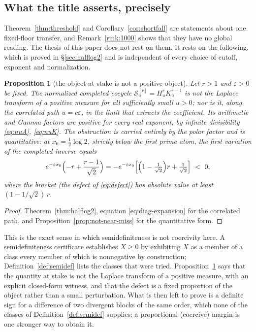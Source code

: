 \documentclass[11pt]{amsart}
\newtheorem{proposition}[theorem]{Proposition}
\theoremstyle{definition}
\theoremstyle{remark}
\theoremstyle{definition}
\newcommand{\eps}{\varepsilon}
\begin{document}
\subsection{What the title asserts, precisely}\label{sec:thesis}

Theorem~\ref{thm:threshold} and Corollary~\ref{cor:shortfall} are statements about one
fixed-floor transfer, and Remark~\ref{rmk:1000} shows that they have no global reading. The thesis of this paper does not rest on them. It rests on the following,
which is proved in \S\ref{sec:halflog2} and is independent of every choice of cutoff, exponent
and normalization.

\begin{proposition}[the object at stake is not a positive object]\label{prop:thesis}
Let $r>1$ and $\eps>0$ be fixed. The normalized completed cocycle
$\mathcal S_u^{[r]}=H_u^{r}K_u^{r-1}$ is not the Laplace transform of a positive measure for all
sufficiently small $u>0$; nor is it, along the correlated path $u=c\eps$, in the limit that
extracts the coefficient. Its arithmetic and Gamma factors \emph{are} positive for every real
exponent, by infinite divisibility \eqref{eq:nuA}, \eqref{eq:nuK}. The obstruction is carried
entirely by the polar factor and is quantitative: at $x_0=\tfrac12\log2$, strictly below the
first prime atom, the first variation of the completed inverse equals
\[
   e^{-\eps x_0}\Bigl(-r+\frac{r-1}{\sqrt2}\Bigr)
   =-e^{-\eps x_0}\Bigl[\Bigl(1-\tfrac1{\sqrt2}\Bigr)r+\tfrac1{\sqrt2}\Bigr]\ <\ 0 ,
\]
where the bracket (the defect of \eqref{eq:defect}) has absolute value at least $(1-1/\sqrt2)\,r$.
\end{proposition}

\begin{proof}
Theorem~\ref{thm:halflog2}, equation \eqref{eq:diag-expansion} for the correlated path, and
Proposition~\ref{prop:not-near-miss} for the quantitative form.
\end{proof}

This is the exact sense in which semidefiniteness is not coercivity here. A semidefiniteness
certificate establishes $X\ge0$ by exhibiting $X$ as a member of a class every member of which is
nonnegative by construction; Definition~\ref{def:semidef} lists the classes that were tried.
Proposition~\ref{prop:thesis} says that the quantity at stake is not the Laplace transform of a
positive measure, with an explicit closed-form witness, and that the defect is a fixed proportion
of the object rather than a small perturbation. What is then left to prove is a definite sign for
a difference of two divergent blocks of the same order, which none of the classes of
Definition~\ref{def:semidef} supplies; a proportional (coercive) margin is one stronger way to
obtain it.
\end{document}

